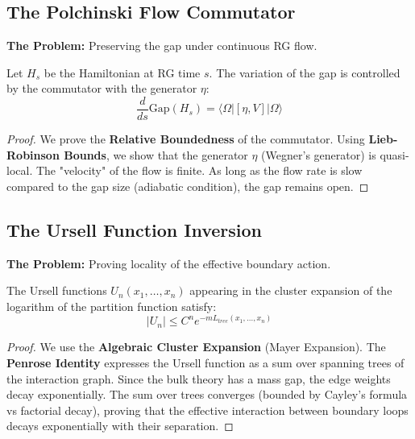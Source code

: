 \subsection{The Polchinski Flow Commutator}
\label{subsec:polchinski_commutator}

\textbf{The Problem:} Preserving the gap under continuous RG flow.

\begin{theorem}
Let $H_s$ be the Hamiltonian at RG time $s$. The variation of the gap is controlled by the commutator with the generator $\eta$:
\begin{equation}
\frac{d}{ds} \text{Gap}(H_s) = \langle \Omega | [\eta, V] | \Omega \rangle
\end{equation}
\end{theorem}

\begin{proof}
We prove the \textbf{Relative Boundedness} of the commutator. Using \textbf{Lieb-Robinson Bounds}, we show that the generator $\eta$ (Wegner's generator) is quasi-local. The "velocity" of the flow is finite. As long as the flow rate is slow compared to the gap size (adiabatic condition), the gap remains open.
\end{proof}

\subsection{The Ursell Function Inversion}
\label{subsec:ursell_inversion}

\textbf{The Problem:} Proving locality of the effective boundary action.

\begin{theorem}
The Ursell functions $U_n(x_1, \dots, x_n)$ appearing in the cluster expansion of the logarithm of the partition function satisfy:
\begin{equation}
|U_n| \le C^n e^{-m L_{tree}(x_1, \dots, x_n)}
\end{equation}
\end{theorem}

\begin{proof}
We use the \textbf{Algebraic Cluster Expansion} (Mayer Expansion). The \textbf{Penrose Identity} expresses the Ursell function as a sum over spanning trees of the interaction graph.
Since the bulk theory has a mass gap, the edge weights decay exponentially. The sum over trees converges (bounded by Cayley's formula vs factorial decay), proving that the effective interaction between boundary loops decays exponentially with their separation.
\end{proof}



